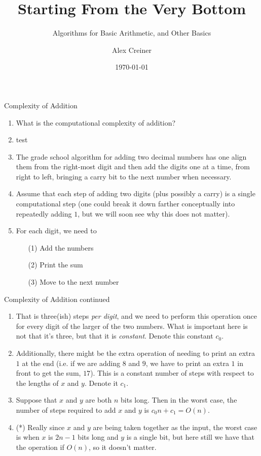 \documentclass{beamer}
\title{Starting From the Very Bottom}
\subtitle{Algorithms for Basic Arithmetic, and Other Basics}
\author{Alex Creiner}
\institute{Boston College}
\date{\today}
\begin{document}
\titlepage

\begin{frame}{Complexity of Addition}
    \begin{enumerate}
        \item What is the computational complexity of addition?
            \pause
        \item test
        \item The grade school algorithm for adding two decimal numbers has one align them from the right-most digit and then add the digits one at a time, from right to left, bringing a carry bit to the next number when necessary. 
        \item Assume that each step of adding two digits (plus possibly a carry) is a single computational step (one could break it down farther conceptually into repeatedly adding $1$, but we will soon see why this does not matter).
            \pause 
        \item For each digit, we need to 
            \begin{itemize}
                \item[(1)] Add the numbers
                \item[(2)] Print the sum
                \item[(3)] Move to the next number
            \end{itemize}
    \end{enumerate}
\end{frame}

\begin{frame}{Complexity of Addition continued}
    \begin{enumerate}
        \item That is three(ish) steps \textit{per digit}, and we need to perform this operation once for every digit of the larger of the two numbers. What is important here is not that it's three, but that it is \textit{constant}. Denote this constant $c_0$.
            \pause 
        \item Additionally, there might be the extra operation of needing to print an extra $1$ at the end (i.e. if we are adding $8$ and $9$, we have to print an extra $1$ in front to get the sum, $17$). This is a constant number of steps with respect to the lengths of $x$ and $y$. Denote it $c_1$.
        \item Suppose that $x$ and $y$ are both $n$ bits long. Then in the worst case, the number of steps required to add $x$ and $y$ is $c_0n + c_1 = O(n)$.
            \pause
        \item (*) Really since $x$ and $y$ are being taken together as the input, the worst case is when $x$ is $2n-1$ bits long and $y$ is a single bit, but here still we have that the operation if $O(n)$, so it doesn't matter. 
    \end{enumerate}
\end{frame}
\end{document}
